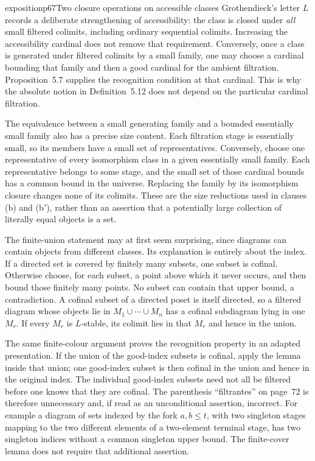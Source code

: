 \begin{dcomment}{exposition}{p67}{Two closure operations on accessible classes}
Grothendieck's letter $L$ records a deliberate strengthening of accessibility: the class is closed under \emph{all} small filtered colimits, including ordinary sequential colimits. Increasing the accessibility cardinal does not remove that requirement. Conversely, once a class is generated under filtered colimits by a small family, one may choose a cardinal bounding that family and then a good cardinal for the ambient filtration. Proposition~5.7 supplies the recognition condition at that cardinal. This is why the absolute notion in Definition~5.12 does not depend on the particular cardinal filtration.

The equivalence between a small generating family and a bounded essentially small family also has a precise size content. Each filtration stage is essentially small, so its members have a small set of representatives. Conversely, choose one representative of every isomorphism class in a given essentially small family. Each representative belongs to some stage, and the small set of those cardinal bounds has a common bound in the universe. Replacing the family by its isomorphism closure changes none of its colimits. These are the size reductions used in clauses (b) and (b$'$), rather than an assertion that a potentially large collection of literally equal objects is a set.

The finite-union statement may at first seem surprising, since diagrams can contain objects from different classes. Its explanation is entirely about the index. If a directed set is covered by finitely many subsets, one subset is cofinal. Otherwise choose, for each subset, a point above which it never occurs, and then bound those finitely many points. No subset can contain that upper bound, a contradiction. A cofinal subset of a directed poset is itself directed, so a filtered diagram whose objects lie in $M_1\cup\cdots\cup M_n$ has a cofinal subdiagram lying in one $M_r$. If every $M_r$ is $L$-stable, its colimit lies in that $M_r$ and hence in the union.

The same finite-colour argument proves the recognition property in an adapted presentation. If the union of the good-index subsets is cofinal, apply the lemma inside that union; one good-index subset is then cofinal in the union and hence in the original index. The individual good-index subsets need not all be filtered before one knows that they are cofinal. The parenthesis ``filtrantes'' on page~72 is therefore unnecessary and, if read as an unconditional assertion, incorrect. For example a diagram of sets indexed by the fork $a,b\leq t$, with two singleton stages mapping to the two different elements of a two-element terminal stage, has two singleton indices without a common singleton upper bound. The finite-cover lemma does not require that additional assertion.


\end{dcomment}
